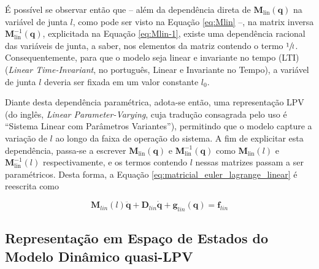 \documentclass{ppgeesa}
\begin{document}
É possível se observar então que -- além da dependência direta de $\mathbf{M}_{\text{lin}}(\mathbf{q})$ na variável de junta $l$, como pode ser visto na Equação \ref{eq:Mlin} --, na matrix inversa $\mathbf{M}_{\text{lin}}^{-1}(\mathbf{q})$, explicitada na Equação \ref{eq:Mlin-1}, existe uma dependência racional das variáveis de junta, a saber, nos elementos da matriz contendo o termo $\sfrac{1}{l}$. Consequentemente, para que o modelo seja linear e invariante no tempo (LTI) (\textit{Linear Time-Invariant}, no português, Linear e Invariante no Tempo), a variável de junta $l$ deveria ser fixada em um valor constante $l_0$. 

Diante desta dependência paramétrica, adota-se então, uma representação LPV (do inglês, \textit{Linear Parameter-Varying}, cuja tradução consagrada pelo uso é ``Sistema Linear com Parâmetros Variantes''), permitindo que o modelo capture a variação de $l$ ao longo da faixa de operação do sistema. A fim de explicitar esta dependência, passa-se a escrever $\mathbf{M}_{\text{lin}}(\mathbf{q})$ e $\mathbf{M}_{\text{lin}}^{-1}(\mathbf{q})$ como $\mathbf{M}_{\text{lin}}(l)$ e $\mathbf{M}_{\text{lin}}^{-1}(l)$ respectivamente, e os termos contendo $l$ nessas matrizes passam a ser paramétricos\cite{thiago2026}. Desta forma, a Equação \ref{eq:matricial_euler_lagrange_linear} é reescrita como

\begin{equation}
  \mathbf{M}_{lin}(l)\ddot{\mathbf{q}}+\mathbf{D}_{lin}\dot{\mathbf{q}}+\mathbf{g}_{lin}(\mathbf{q}) = \mathbf{f}_{lin}\label{eq:matricial_euler_lagrange_lpv}
\end{equation}


\subsection{Representação em Espaço de Estados do Modelo Dinâmico quasi-LPV}
\end{document}
